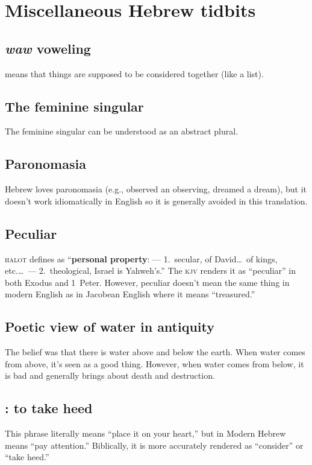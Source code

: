 \section{Miscellaneous Hebrew tidbits}\label{app:misc-heb}
\subsection{\textit{waw} voweling}\label{app:waw-voweling}
 means that things are supposed to be considered together (like a list).

\subsection{The feminine singular}
The feminine singular can be understood as an abstract plural.

\subsection{Paronomasia}\label{app:paronomasia}
Hebrew loves paronomasia (e.g., observed an observing, dreamed a dream), but it doesn't work idiomatically in English so it is generally avoided in this translation.

\subsection{Peculiar}\label{app:peculiar}
\textsc{halot} defines  as ``\textbf{personal property}: --- 1.\ secular, of David\dots\ of kings, etc.\dots\ --- 2.\ theological, Israel is Yahweh's.'' The \textsc{kjv} renders it as ``peculiar'' in both Exodus and 1~Peter. However, peculiar doesn't mean the same thing in modern English as in Jacobean English where it means ``treasured.''

\subsection{Poetic view of water in antiquity}\label{app:water-in-antiquity}
The belief was that there is water above and below the earth. When water comes from above, it's seen as a good thing. However, when water comes from below, it is bad and generally brings about death and destruction.

\subsection{ : to take heed}\label{app:take-heed}
This phrase literally means ``place it on your heart,'' but in Modern Hebrew means ``pay attention.'' Biblically, it is more accurately rendered as ``consider'' or ``take heed.''
